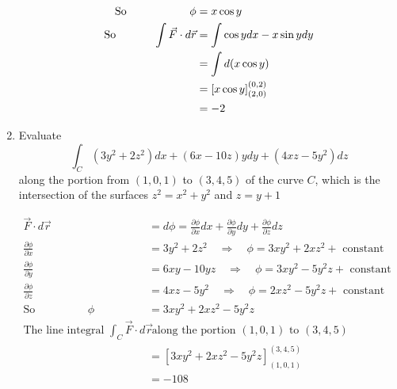 \begin{enumerate}
\begin{answer}
\begin{align*}
		 \text{So}\hspace{2cm}  \phi &=x \cos y \\ \text{So}\hspace{1.2cm} \int \vec{F} \cdot d \vec{r} &=\int \cos y d x-x \sin y d y \\ &=\int d(x \cos y) \\ &=[x \cos y]_{(2,0)}^{(0,2)} \\ &=-2 
		\end{align*}
	\end{answer}
	\item Evaluate
	$$
	\int_{C}\left(3 y^{2}+2 z^{2}\right) d x+(6 x-10 z) y d y+\left(4 x z-5 y^{2}\right) d z
	$$
	along the portion from $(1,0,1)$ to $(3,4,5)$ of the curve $C$, which is the intersection of the surfaces $z^{2}=x^{2}+y^{2}$ and $z=y+1$
	\begin{answer}
		\begin{align*}
	 \vec{F} \cdot d \vec{r} &=d \phi=\frac{\partial \phi}{\partial x} d x+\frac{\partial \phi}{\partial y} d y+\frac{\partial \phi}{\partial z} d z \\ \frac{\partial \phi}{\partial x} &=3 y^{2}+2 z^{2} \quad \Rightarrow \quad \phi=3 x y^{2}+2 x z^{2}+\text { constant } \\ \frac{\partial \phi}{\partial y} &=6 x y-10 y z \quad \Rightarrow \quad \phi=3 x y^{2}-5 y^{2} z+\text { constant } \\ \frac{\partial \phi}{\partial z} &=4 x z-5 y^{2} \quad \Rightarrow \quad \phi=2 x z^{2}-5 y^{2} z+\text { constant } \\ \text{So}\hspace{2cm}\phi &=3 x y^{2}+2 x z^{2}-5 y^{2} z \\
	 \text{The line integral }\int_{C} \vec{F} \cdot d \vec{r}&\text{ along the portion }(1,0,1)\text{ to }(3,4,5)\\
	 &=\left[3 x y^{2}+2 x z^{2}-5 y^{2} z\right]_{(1,0,1)}^{(3,4,5)} \\
	 &=-108
		\end{align*}
	\end{answer}
	
	
	
	
	
	
	
	
	
	
	
	
\end{enumerate}